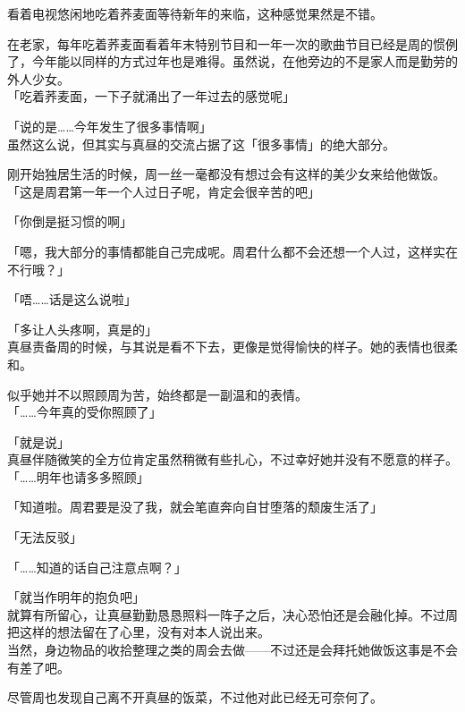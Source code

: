 看着电视悠闲地吃着荞麦面等待新年的来临，这种感觉果然是不错。

在老家，每年吃着荞麦面看着年末特别节目和一年一次的歌曲节目已经是周的惯例了，今年能以同样的方式过年也是难得。虽然说，在他旁边的不是家人而是勤劳的外人少女。\\

「吃着荞麦面，一下子就涌出了一年过去的感觉呢」

「说的是……今年发生了很多事情啊」\\

虽然这么说，但其实与真昼的交流占据了这「很多事情」的绝大部分。

刚开始独居生活的时候，周一丝一毫都没有想过会有这样的美少女来给他做饭。\\

「这是周君第一年一个人过日子呢，肯定会很辛苦的吧」

「你倒是挺习惯的啊」

「嗯，我大部分的事情都能自己完成呢。周君什么都不会还想一个人过，这样实在不行哦？」

「唔……话是这么说啦」

「多让人头疼啊，真是的」\\

真昼责备周的时候，与其说是看不下去，更像是觉得愉快的样子。她的表情也很柔和。

似乎她并不以照顾周为苦，始终都是一副温和的表情。\\

「……今年真的受你照顾了」

「就是说」\\

真昼伴随微笑的全方位肯定虽然稍微有些扎心，不过幸好她并没有不愿意的样子。\\

「……明年也请多多照顾」

「知道啦。周君要是没了我，就会笔直奔向自甘堕落的颓废生活了」

「无法反驳」

「……知道的话自己注意点啊？」

「就当作明年的抱负吧」\\

就算有所留心，让真昼勤勤恳恳照料一阵子之后，决心恐怕还是会融化掉。不过周把这样的想法留在了心里，没有对本人说出来。\\

当然，身边物品的收拾整理之类的周会去做——不过还是会拜托她做饭这事是不会有差了吧。

尽管周也发现自己离不开真昼的饭菜，不过他对此已经无可奈何了。\\

